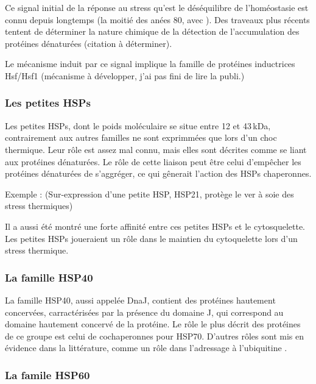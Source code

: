 Ce signal initial de la réponse au stress qu'est le déséquilibre de l'homéostasie est connu depuis longtemps (la moitié des anées 80, avec \citet{ananthan1986}).
Des traveaux plus récents tentent de déterminer la nature chimique de la détection de l'accumulation des protéines dénaturées (citation à déterminer).

Le mécanisme induit par ce signal implique la famille de protéines inductrices Hsf/Hsf1 \citet{voellmy2004} (mécanisme à développer, j'ai pas fini de lire la publi.)

\subsubsection{Les petites HSPs} %
\label{ssub:les_petites_hsps}

  Les petites HSPs, dont le poids moléculaire se situe entre 12 et 43\,kDa,
  contrairement aux autres familles ne sont exprimmées que lors d'un choc
  thermique. Leur rôle est assez mal connu,
  mais elles sont décrites comme se liant aux protéines dénaturées.
  Le rôle de cette liaison peut être celui d'empêcher les protéines dénaturées
  de s'aggréger, ce qui gênerait l'action des HSPs chaperonnes.

  Exemple : \cite{liu2013} (Sur-expression d'une petite HSP, HSP21, protège le
  ver à soie des stress thermiques)

  Il a aussi été montré une forte affinité entre ces petites HSPs et le cytosquelette.
  Les petites HSPs joueraient un rôle dans le maintien du cytoquelette lors d'un stress thermique.


\subsubsection{La famille HSP40} %
\label{ssub:la_famille_hsp40}

  La famille HSP40, aussi appelée DnaJ, contient des protéines hautement
  concervées, carractérisées par la présence du domaine J, qui correspond au
  domaine hautement concervé de la protéine. Le rôle le plus décrit des
  protéines de ce groupe est celui de cochaperonnes pour HSP70. D'autres rôles
  sont mis en évidence dans la littérature, comme un rôle dans l'adressage à
  l'ubiquitine \cite{lee1996}.

\subsubsection{La famile HSP60} %
\label{ssub:la_famile_hsp60}

